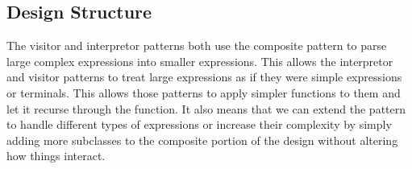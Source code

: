 \documentclass{article}
\begin{document}
\subsection*{Design Structure} %
\label{sub:design_structure}
The visitor and interpretor patterns both use the composite pattern to parse large complex expressions into smaller expressions. This allows the interpretor and visitor patterns to treat large expressions as if they were simple expressions or terminals. This allows those patterns to apply simpler functions to them and let it recurse through the function. It also means that we can extend the pattern to handle different types of expressions or increase their complexity by simply adding more subclasses to the composite portion of the design without altering how things interact.





\end{document}
